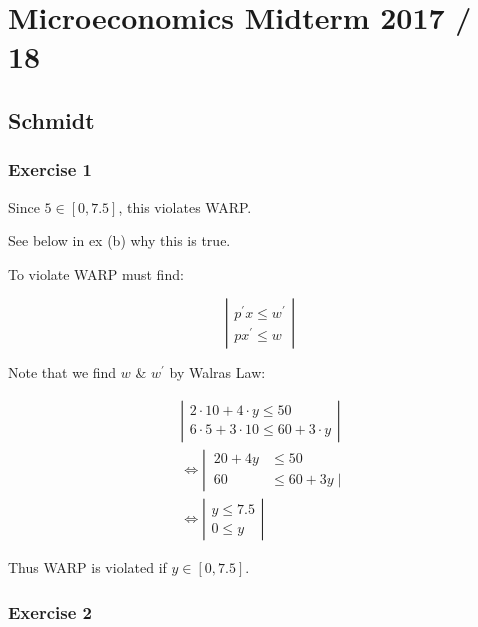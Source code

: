 \section{Microeconomics Midterm 2017 / 18}

{
\subsection*{Schmidt}

{
\subsubsection*{Exercise 1}

\begin{enumerate}[label=(\alph*)]
{\item 
Since $5 \in[0,7.5]$, this violates WARP. 

See below in ex (b) why this is true.
}
{\item 
To violate WARP must find:

$$
\left|\begin{array}{l}
p^{\prime} x \leq w^{\prime} \\
p x^{\prime} \leq w
\end{array}\right|
$$

Note that we find $w$ \& $w^{\prime}$ by Walras Law:

$$
\begin{aligned}
& \left|\begin{array}{l}
2 \cdot 10+4 \cdot y \leq 50 \\
6 \cdot 5+3 \cdot 10 \leq 60+3 \cdot y
\end{array}\right| \\
& \Leftrightarrow \left\lvert\, \begin{aligned}
20+4 y & \leqslant 50 \\
60 & \leqslant 60+3 y \mid
\end{aligned}\right. \\
& \Longleftrightarrow\left|\begin{array}{l}
y \leqslant 7.5 \\
0 \leqslant y
\end{array}\right|
\end{aligned}
$$

Thus WARP is violated if $y \in[0,7.5]$.
}
\end{enumerate}
}
{
\subsubsection*{Exercise 2}

}}
